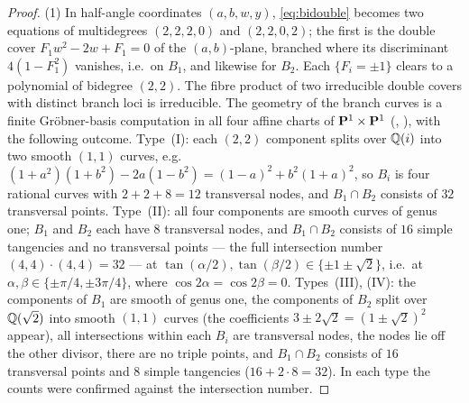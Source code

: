 \begin{proof}
(1) In half-angle coordinates $(a,b,w,y)$, \eqref{eq:bidouble} becomes two equations of multidegrees $(2,2,2,0)$ and
$(2,2,0,2)$; the first is the double cover $F_1w^2-2w+F_1=0$ of the $(a,b)$-plane, branched where its discriminant
$4(1-F_1^2)$ vanishes, i.e.\ on $B_1$, and likewise for $B_2$. Each $\{F_i=\pm1\}$ clears to a polynomial of bidegree
$(2,2)$. The fibre product of two irreducible double covers with distinct branch loci is irreducible. The geometry of the
branch curves is a finite Gr\"obner-basis computation in all four affine charts of $\mathbf P^1\times\mathbf P^1$
(, ), with the following outcome. Type~(I): each $(2,2)$
component splits over $\mathbb Q(i)$ into two smooth $(1,1)$ curves, e.g.\ $(1+a^2)(1+b^2)-2a(1-b^2)=(1-a)^2+b^2(1+a)^2$, so
$B_i$ is four rational curves with $2+2+8=12$ transversal nodes, and $B_1\cap B_2$ consists of $32$ transversal points.
Type~(II): all four components are smooth curves of genus one; $B_1$ and $B_2$ each have $8$ transversal nodes, and
$B_1\cap B_2$ consists of $16$ simple tangencies and no transversal points — the full intersection number
$(4,4)\cdot(4,4)=32$ — at $\tan(\alpha/2),\tan(\beta/2)\in\{\pm1\pm\sqrt2\}$, i.e.\ at $\alpha,\beta\in\{\pm\pi/4,\pm3\pi/4\}$,
where $\cos2\alpha=\cos2\beta=0$. Types~(III), (IV): the components of $B_1$
are smooth of genus one, the components of $B_2$ split over $\mathbb Q(\sqrt2)$ into smooth $(1,1)$ curves (the coefficients
$3\pm2\sqrt2=(1\pm\sqrt2)^2$ appear), all intersections within each $B_i$ are transversal nodes, the nodes lie off the other
divisor, there are no triple points, and $B_1\cap B_2$ consists of $16$ transversal points and $8$ simple tangencies
($16+2\cdot8=32$). In each type the counts were confirmed against the intersection number.


\end{proof}
